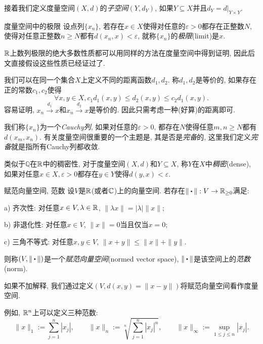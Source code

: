 接着我们定义度量空间$(X,d)$的\textit{子空间}$(Y,d_Y)$, 如果$Y \subseteq X$并且$d_Y = d|_{Y \times Y}$. 

\begin{definition}{度量空间中的极限}
	设点列$\{ x_n \}$, 若存在$x \in X$使得对任意的$\varepsilon >0$都存在正整数$N$, 使得对任意正整数$n\geq N$都有$d(x_n,x)<\varepsilon$, 就称$\{ x_n \}$的\textit{极限}(limit)是$x$. 
\end{definition}
\begin{remark}
	$\mathbb{R}$上数列极限的绝大多数性质都可以用同样的方法在度量空间中得到证明, 因此后文直接假设这些性质已经证过了. 
\end{remark}

我们可以在同一个集合$X$上定义不同的距离函数$d_1,d_2$. 称$d_1,d_2$是等价的, 如果存在正的常数$c_1,c_2$使得$$\forall x,y \in X, c_1d_1(x,y) \leq d_2(x,y) \leq c_2d_1(x,y).$$
容易证明, $x_n \stackrel{d_1}{\longrightarrow} x$和$x_n \stackrel{d_2}{\longrightarrow} x$是等价的. 因此只需考虑一种(好算)的距离即可. 

我们称$\{ x_n \}$为一个\textit{Cauchy列}, 如果对任意的$\varepsilon >0$, 都存在$N$使得任意$m,n \geq N$都有$d(x_m,x_n)$. 有关度量空间很重要的一个主题是, 其是否是\textit{完备}的, 这里我们定义\textit{完备}就是指所有Cauchy列都收敛. 

类似于$\mathbb{Q}$在$\mathbb{R}$中的稠密性, 对于度量空间$(X,d)$和$Y \subseteq X$, 称$Y$在$X$中\textit{稠密}(dense), 如果对任意$x \in X, \varepsilon >0$都存在$y \in Y$使得$d(y,x) < \varepsilon$. 

\begin{definition}{赋范向量空间, 范数}
	设$V$是$\mathbb{R}$(或者$\mathbb{C}$)上的向量空间. 若存在$\| \bigcdot \|:V \to \R _{\geq 0}$满足: 
	
	a) 齐次性: 对任意$x \in V, \lambda \in \mathbb{R}$, $\| \lambda x \|=|\lambda | \| x \|$; 
	
	b) 非退化性: 对任意$x \in V$, $\| x \|=0$当且仅当$x=0$; 
	
	c) 三角不等式: 对任意$x,y \in V$, $\| x+y \| \leq \| x \|+\| y \|$. 
	
	\noindent
	则称$(V,\| \bigcdot \| )$是一个\textit{赋范向量空间}(normed vector space), $\| \bigcdot \|$是该空间上的\textit{范数}(norm). 
\end{definition}
\begin{remark}
	如果不加解释, 我们通过定义$(V,d(x,y)=\| x-y \|)$将赋范向量空间看作度量空间. 
\end{remark}

例如, $\mathbb{R} ^n$上可以定义三种范数: $$\| x \|_1 := \sum_{j=1}^n |x_j|,\qquad \| x \|_n := \sqrt[n]{\sum_{j=1}^n |x_j|^n},\qquad \| x \|_{\infty} := \sup_{1 \leq j \leq n}|x_j|. $$

